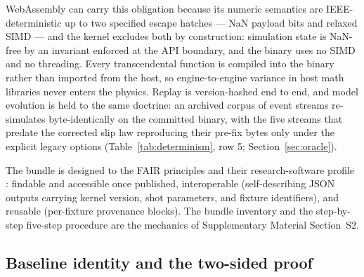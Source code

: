 WebAssembly can carry this obligation because its numeric semantics are
IEEE-deterministic up to two specified escape hatches --- NaN payload
bits and relaxed SIMD \citep{wasm2015nondeterminism} --- and the kernel
excludes both by construction: simulation state is NaN-free by an
invariant enforced at the API boundary, and the binary uses no SIMD and
no threading. Every transcendental function is compiled into the binary
rather than imported from the host, so engine-to-engine variance in
host math libraries never enters the physics. Replay is version-hashed
end to end, and model evolution is held to the same doctrine: an
archived corpus of event streams re-simulates byte-identically on the
committed binary, with the five streams that predate the corrected slip
law reproducing their pre-fix bytes only under the explicit legacy
options (Table~\ref{tab:determinism}, row 5; Section~\ref{sec:oracle}).

The bundle is designed to the FAIR principles \citep{wilkinson2016fair}
and their research-software profile \citep{chuehong2022fair4rs}: findable
and accessible once published, interoperable
(self-describing JSON outputs carrying kernel version, shot parameters,
and fixture identifiers), and reusable (per-fixture provenance
blocks). The bundle inventory and the step-by-step five-step
procedure are the mechanics of Supplementary Material Section~S2.

\subsection{Baseline identity and the two-sided proof}

